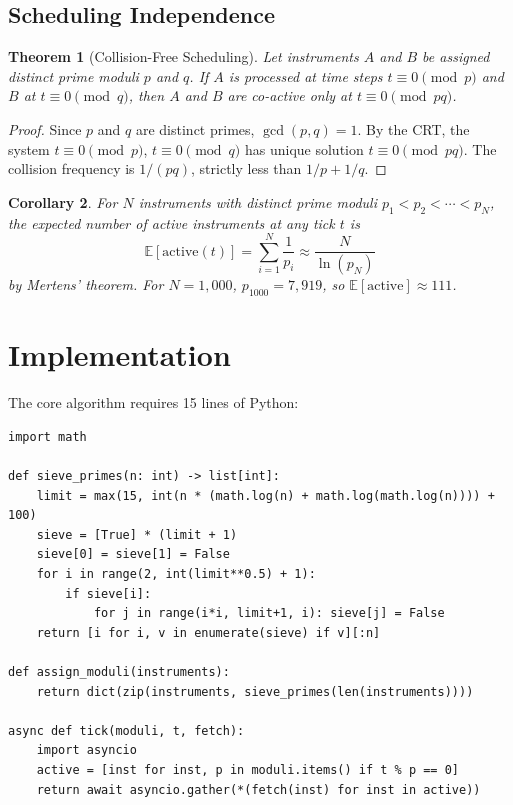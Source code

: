 \documentclass[11pt,a4paper]{article}
\newtheorem{theorem}{Theorem}
\newtheorem{corollary}[theorem]{Corollary}
\begin{document}
\subsection{Scheduling Independence}

\begin{theorem}[Collision-Free Scheduling]
Let instruments $A$ and $B$ be assigned distinct prime moduli $p$ and $q$. If $A$ is processed at time steps $t \equiv 0 \pmod{p}$ and $B$ at $t \equiv 0 \pmod{q}$, then $A$ and $B$ are co-active only at $t \equiv 0 \pmod{pq}$.
\end{theorem}

\begin{proof}
Since $p$ and $q$ are distinct primes, $\gcd(p, q) = 1$. By the CRT, the system $t \equiv 0 \pmod{p}$, $t \equiv 0 \pmod{q}$ has unique solution $t \equiv 0 \pmod{pq}$. The collision frequency is $1/(pq)$, strictly less than $1/p + 1/q$.
\end{proof}

\begin{corollary}
For $N$ instruments with distinct prime moduli $p_1 < p_2 < \cdots < p_N$, the expected number of active instruments at any tick $t$ is
\[
\mathbb{E}[\mathrm{active}(t)] = \sum_{i=1}^{N} \frac{1}{p_i} \approx \frac{N}{\ln(p_N)}
\]
by Mertens' theorem. For $N = 1{,}000$, $p_{1000} = 7{,}919$, so $\mathbb{E}[\mathrm{active}] \approx 111$.
\end{corollary}

\section{Implementation}

The core algorithm requires 15 lines of Python:

\begin{lstlisting}[caption={CRT Scheduler Core}]
import math

def sieve_primes(n: int) -> list[int]:
    limit = max(15, int(n * (math.log(n) + math.log(math.log(n)))) + 100)
    sieve = [True] * (limit + 1)
    sieve[0] = sieve[1] = False
    for i in range(2, int(limit**0.5) + 1):
        if sieve[i]:
            for j in range(i*i, limit+1, i): sieve[j] = False
    return [i for i, v in enumerate(sieve) if v][:n]

def assign_moduli(instruments):
    return dict(zip(instruments, sieve_primes(len(instruments))))

async def tick(moduli, t, fetch):
    import asyncio
    active = [inst for inst, p in moduli.items() if t % p == 0]
    return await asyncio.gather(*(fetch(inst) for inst in active))
\end{lstlisting}
\end{document}
